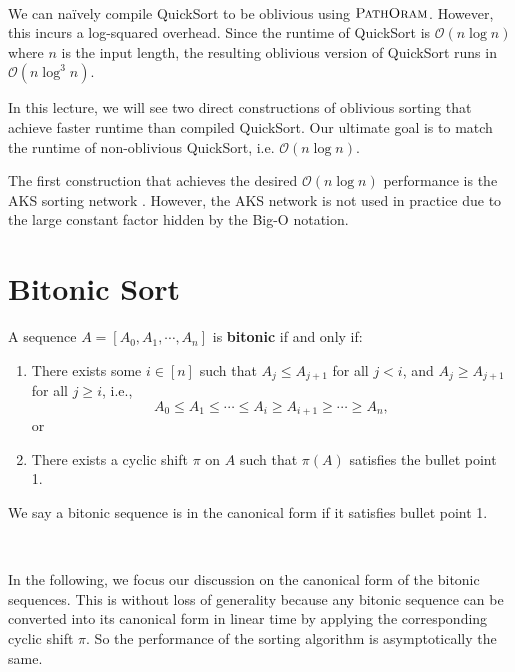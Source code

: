 $ $

We can na\"ively compile QuickSort to be oblivious using $\textsc{PathOram}$. However, this incurs a log-squared overhead. Since the runtime of QuickSort is $\mathcal{O}(n\log n)$ where $n$ is the input length, the resulting oblivious version of QuickSort runs in $\mathcal{O}(n\log^3 n)$.

In this lecture, we will see two direct constructions of oblivious sorting that achieve faster runtime than compiled QuickSort. Our ultimate goal is to match the runtime of non-oblivious QuickSort, i.e. $\mathcal{O}(n\log n)$.

\begin{mdframed}[innertopmargin=0pt, skipabove=\topskip, skipbelow=\topskip,align=left]
   \begin{remark}
       The first construction that achieves the desired $\mathcal{O}(n \log n)$ performance is the AKS sorting network \cite{aks}. However, the AKS network is not used in practice due to the large constant factor hidden by the Big-O notation.
       
   \end{remark}
\end{mdframed}

\section{Bitonic Sort \cite{Batcher}}

\begin{definition}
    A sequence $A = [A_0, A_1, \cdots, A_n]$ is \textbf{bitonic} if and only if:
    \begin{enumerate}
        \item There exists some $i \in [n]$ such that $A_j \leq A_{j+1}$ for all $j < i$, and $A_j \geq A_{j+1}$ for all $j \geq i$, i.e., 
        \[A_0 \leq A_1 \leq \cdots \leq A_i \geq A_{i+1} \geq \cdots \geq A_n, \]
        or

        \item There exists a cyclic shift $\pi$ on $A$ such that $\pi(A)$ satisfies the bullet point 1.
    \end{enumerate}

    We say a bitonic sequence is in the canonical form if it satisfies bullet point 1.
\end{definition}

$ $

In the following, we focus our discussion on the canonical form of the bitonic sequences. This is without loss of generality because any bitonic sequence can be converted into its canonical form in linear time by applying the corresponding cyclic shift $\pi$. So the performance of the sorting algorithm is asymptotically the same.

